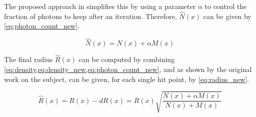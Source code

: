 \documentclass[main.tex]{subfiles}
\begin{document}
The proposed approach in \cite{hachisuka2008progressive} simplifies this by using a parameter $\alpha$ to control the fraction of photons to keep after an iteration. Therefore, $\hat{N}(x)$ can be given by \cref{eq:photon_count_new}.

\begin{figure}[!htp]
  \begin{equation}
    \hat{N}(x) = N(x) + \alpha M(x)
  \label{eq:photon_count_new}
  \end{equation}
\end{figure}



The final radius $\hat{R}(x)$ can be computed by combining \cref{eq:density,eq:density_new,eq:photon_count_new}, and as shown by the original work on the subject, can be given, for each single hit point, by \cref{eq:radius_new}.

\begin{figure}[!htp]
  \begin{equation}
    \hat{R}(x) = R(x) - dR(x) = R(x) \sqrt{\frac{N(x) + \alpha M(x)}{N(x) + M(x)}}
  \label{eq:radius_new}
  \end{equation}
\end{figure}
\end{document}
